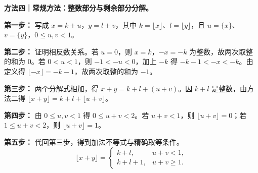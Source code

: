 \clearpage
\begin{proofbox}
\textbf{方法四｜常规方法：整数部分与剩余部分分解。}

\textbf{第一步：} 写成 $x=k+u$，$y=l+v$，其中 $k=\lfloor x\rfloor$、$l=\lfloor y\rfloor$，且 $u=\{x\}$、$v=\{y\}$，$0\le u,v<1$。

\textbf{第二步：} 证明相反数关系。若 $u=0$，则 $x=k$，$-x=-k$ 为整数，故两次取整的和为 $0$。若 $0<u<1$，则 $-1<-u<0$，加上 $-k$ 得 $-k-1<-x<-k$。由定义得 $\lfloor-x\rfloor=-k-1$，故两次取整的和为 $-1$。

\textbf{第三步：} 两个分解式相加，得 $x+y=k+l+(u+v)$。因 $k+l$ 是整数，由方法二得 $\lfloor x+y\rfloor=k+l+\lfloor u+v\rfloor$。

\textbf{第四步：} 由 $0\le u,v<1$ 得 $0\le u+v<2$。若 $u+v<1$，则 $\lfloor u+v\rfloor=0$；若 $1\le u+v<2$，则 $\lfloor u+v\rfloor=1$。

\textbf{第五步：} 代回第三步，得到加法不等式与精确取等条件。
\[\lfloor x+y\rfloor=\begin{cases}k+l,&u+v<1,\\k+l+1,&u+v\ge1.\end{cases}\]
\end{proofbox}
